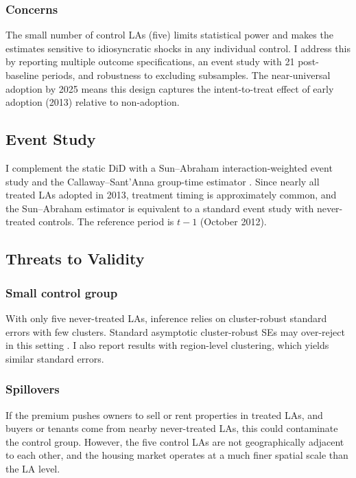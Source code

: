 \documentclass[12pt]{article}
\begin{document}
\subsubsection*{Concerns} The small number of control LAs (five) limits statistical power and makes the estimates sensitive to idiosyncratic shocks in any individual control. I address this by reporting multiple outcome specifications, an event study with 21 post-baseline periods, and robustness to excluding subsamples. The near-universal adoption by 2025 means this design captures the intent-to-treat effect of early adoption (2013) relative to non-adoption.

\subsection{Event Study}

I complement the static DiD with a Sun--Abraham interaction-weighted event study \citep{sun2021estimating} and the Callaway--Sant'Anna group-time estimator \citep{callaway2021difference}. Since nearly all treated LAs adopted in 2013, treatment timing is approximately common, and the Sun--Abraham estimator is equivalent to a standard event study with never-treated controls. The reference period is $t - 1$ (October 2012).

\subsection{Threats to Validity}

\subsubsection*{Small control group} With only five never-treated LAs, inference relies on cluster-robust standard errors with few clusters. Standard asymptotic cluster-robust SEs may over-reject in this setting \citep{cameron2015practitioners}. I also report results with region-level clustering, which yields similar standard errors.

\subsubsection*{Spillovers} If the premium pushes owners to sell or rent properties in treated LAs, and buyers or tenants come from nearby never-treated LAs, this could contaminate the control group. However, the five control LAs are not geographically adjacent to each other, and the housing market operates at a much finer spatial scale than the LA level.
\end{document}
